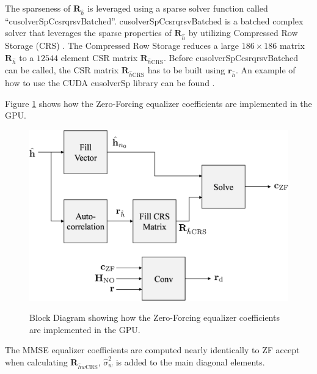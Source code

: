 The sparseness of $\mathbf{R}_{\hat{h}}$ is leveraged using a sparse solver function called ``cusolverSpCcsrqrsvBatched''.
cusolverSpCcsrqrsvBatched is a batched complex solver that leverages the sparse properties of $\mathbf{R}_{\hat{h}}$ by utilizing Compressed Row Storage (CRS) \cite{wiki:Sparse_matrix}.
The Compressed Row Storage reduces a large $186\times186$ matrix $\mathbf{R}_{\hat{h}}$ to a $12544$ element CSR matrix $\mathbf{R}_{\hat{h}\text{CRS}}$.
Before cusolverSpCcsrqrsvBatched can be called, the CSR matrix $\mathbf{R}_{\hat{h}\text{CRS}}$ has to be built using $\mathbf{r}_{\hat{h}}$.
An example of how to use the CUDA cusolverSp library can be found \cite{CUDA_toolkit_doc}.

Figure \ref{fig:blockZF} shows how the Zero-Forcing equalizer coefficients are implemented in the GPU.
\begin{figure}
	\centering\includegraphics[width=7.5in/100*55]{figures/eq_GPUimplementation/blockZF.pdf}
	\label{fig:blockZF}
	\caption{Block Diagram showing how the Zero-Forcing equalizer coefficients are implemented in the GPU.}
\end{figure}
The MMSE equalizer coefficients are computed nearly identically to ZF accept when calculating $\mathbf{R}_{\hat{h}w\text{CRS}}$, $\hat{\sigma}^2_w$ is added to the main diagonal elements.
